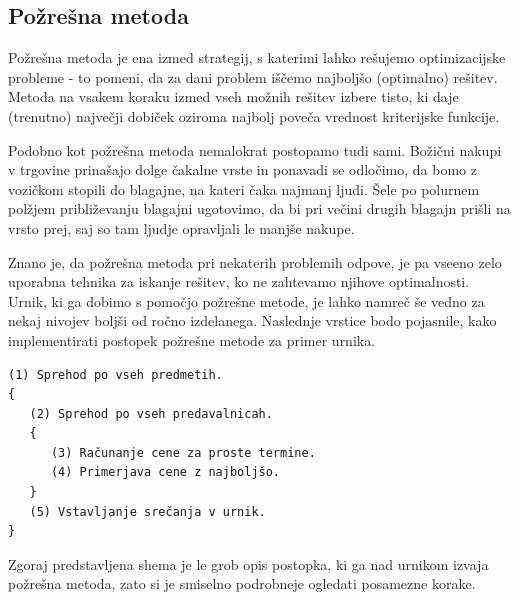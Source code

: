 \documentclass[a4paper,10pt]{article}
\begin{document}
\subsection{Požrešna metoda} %

Požrešna metoda je ena izmed strategij, s katerimi lahko rešujemo optimizacijske probleme -
to pomeni, da za dani problem iščemo najboljšo (optimalno) rešitev. Metoda na vsakem koraku
izmed vseh možnih rešitev izbere  tisto, ki daje (trenutno) največji dobiček oziroma najbolj
poveča vrednost kriterijske funkcije.

Podobno kot požrešna metoda nemalokrat postopamo tudi sami. Božični nakupi v trgovine
prinašajo dolge čakalne vrste in ponavadi se odločimo, da bomo z vozičkom stopili do blagajne,
na kateri čaka najmanj ljudi. Šele po polurnem polžjem približevanju blagajni ugotovimo,
da bi pri večini drugih blagajn prišli na vrsto prej, saj so tam ljudje opravljali le
manjše nakupe.

Znano je, da požrešna metoda pri nekaterih problemih odpove, je pa vseeno zelo uporabna
tehnika za iskanje rešitev, ko ne zahtevamo njihove optimalnosti. Urnik, ki ga dobimo s
pomočjo požrešne metode, je lahko namreč še vedno za nekaj nivojev boljši od ročno izdelanega.
Naslednje vrstice bodo pojasnile, kako implementirati postopek požrešne metode za primer urnika.

\begin{verbatim}
(1) Sprehod po vseh predmetih.
{
   (2) Sprehod po vseh predavalnicah.
   {
      (3) Računanje cene za proste termine.
      (4) Primerjava cene z najboljšo.
   }
   (5) Vstavljanje srečanja v urnik.
}
\end{verbatim}

\noindent
Zgoraj predstavljena shema je le grob opis postopka, ki ga nad urnikom izvaja požrešna metoda,
zato si je smiselno podrobneje ogledati posamezne korake.
\end{document}
